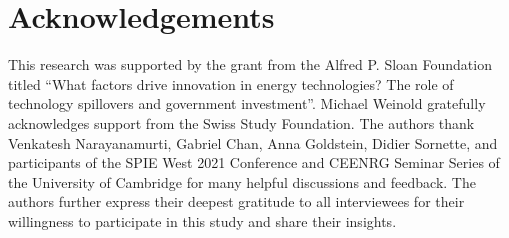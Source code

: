 \documentclass[parskip=full]{article}
\begin{document}
\section{Acknowledgements}

This research was supported by the grant from the Alfred P. Sloan Foundation titled “What factors drive innovation in energy technologies? The role of technology spillovers and government investment”. Michael Weinold gratefully acknowledges support from the Swiss Study Foundation. The authors thank Venkatesh Narayanamurti, Gabriel Chan, Anna Goldstein, Didier Sornette, and participants of the SPIE West 2021 Conference and CEENRG Seminar Series of the University of Cambridge for many helpful discussions and feedback. The authors further express their deepest gratitude to all interviewees for their willingness to participate in this study and share their insights.

\newpage
\printbibliography
\end{document}
